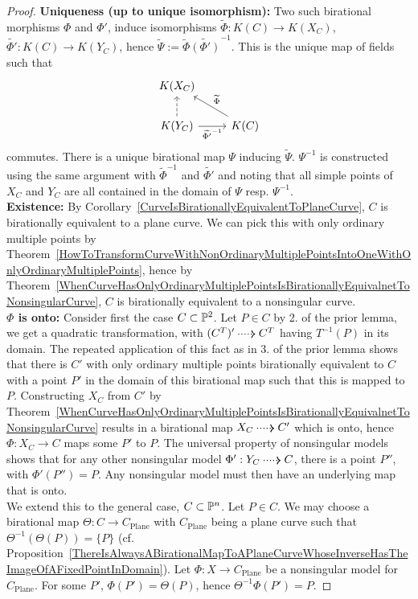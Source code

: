    \begin{proof}
        \textbf{Uniqueness (up to unique isomorphism):} Two such birational morphisms $\Phi$ and $\Phi'$, induce isomorphisms $\widetilde{\Phi} : K(C)\rightarrow K(X_C)$, $\widetilde{\Phi'} : K(C)\rightarrow K(Y_C)$, hence $\widetilde{\Psi} := \widetilde{\Phi}\widetilde{(\Phi')}^{-1}$. This is the unique map of fields such that 
        $$
            \begin{tikzcd}
                K(X_C)\\
                K(Y_C)\arrow[u,dashrightarrow]\arrow[r,"\widetilde{\Phi'}^{-1}"'] & K(C)\arrow[ul,"\widetilde{\Phi}"'] 
            \end{tikzcd}
        $$ 
        commutes. There is a unique birational map $\Psi$ inducing $\widetilde{\Psi}$. $\Psi^{-1}$ is constructed using the same argument with $\widetilde{\Phi}^{-1}$ and $\widetilde{\Phi'}$ and noting that all simple points of $X_C$ and $Y_C$ are all contained in the domain of $\Psi$ resp. $\Psi^{-1}$.\\
        \textbf{Existence:}  By Corollary~\ref{CurveIsBirationallyEquivalentToPlaneCurve}, $C$ is birationally equivalent to a plane curve. We can pick this with only ordinary multiple points by Theorem~\ref{HowToTransformCurveWithNonOrdinaryMultiplePointsIntoOneWithOnlyOrdinaryMultiplePoints}, hence by Theorem~\ref{WhenCurveHasOnlyOrdinaryMultiplePointsIsBirationallyEquivalnetToNonsingularCurve}, $C$ is birationally equivalent to a nonsingular curve.\\ 
        \textbf{$\Phi$ is onto:} Consider first the case $C\subset \mathbb{P}^2$. Let $P\in C$ by 2. of the prior lemma, we get a quadratic transformation, with $(C^T)'\dottedarrow C^T$ having $T^{-1}(P)$ in its domain. The repeated application of this fact as in 3. of the prior lemma shows that there is $C'$ with only ordinary multiple points birationally equivalent to $C$ with a point $P'$ in the domain of this birational map such that this is mapped to $P$. Constructing $X_C$ from $C'$ by Theorem~\ref{WhenCurveHasOnlyOrdinaryMultiplePointsIsBirationallyEquivalnetToNonsingularCurve} results in a birational map $X_C\dottedarrow C'$ which is onto, hence $\Phi : X_C\rightarrow C$ maps some $P'$ to $P$. The universal property of nonsingular models shows that for any other nonsingular model $\Phi': Y_C\dottedarrow C$, there is a point $P''$, with $\Phi'(P'')=P$. Any nonsingular model must then have an underlying map that is onto.\\
        We extend this to the general case, $C\subset \mathbb{P}^n$. Let $P\in C$. We may choose a birational map $\Theta : C\rightarrow C_{\mathrm{Plane}}$ with $C_\mathrm{Plane}$ being a plane curve such that $\Theta^{-1}(\Theta(P))=\{P\}$ (cf. Proposition~\ref{ThereIsAlwaysABirationalMapToAPlaneCurveWhoseInverseHasTheImageOfAFixedPointInDomain}). Let $\Phi :X \rightarrow C_\mathrm{Plane}$ be a nonsingular model for $C_\mathrm{Plane}$. For some $P'$, $\Phi(P')=\Theta(P)$, hence $\Theta^{-1}\Phi(P')=P$.
    \end{proof}


